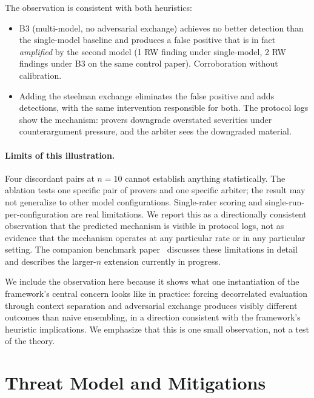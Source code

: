\documentclass[11pt]{article}
\begin{document}
The observation is consistent with both heuristics:
\begin{itemize}
\item B3 (multi-model, no adversarial exchange) achieves no better detection than the single-model baseline and produces a false positive that is in fact \emph{amplified} by the second model (1 RW finding under single-model, 2 RW findings under B3 on the same control paper). Corroboration without calibration.
\item Adding the steelman exchange eliminates the false positive and adds detections, with the same intervention responsible for both. The protocol logs show the mechanism: provers downgrade overstated severities under counterargument pressure, and the arbiter sees the downgraded material.
\end{itemize}

\paragraph{Limits of this illustration.} Four discordant pairs at $n = 10$ cannot establish anything statistically. The ablation tests one specific pair of provers and one specific arbiter; the result may not generalize to other model configurations. Single-rater scoring and single-run-per-configuration are real limitations. We report this as a directionally consistent observation that the predicted mechanism is visible in protocol logs, not as evidence that the mechanism operates at any particular rate or in any particular setting. The companion benchmark paper~\citep{brilliant2026benchmark} discusses these limitations in detail and describes the larger-$n$ extension currently in progress.

We include the observation here because it shows what one instantiation of the framework's central concern looks like in practice: forcing decorrelated evaluation through context separation and adversarial exchange produces visibly different outcomes than naive ensembling, in a direction consistent with the framework's heuristic implications. We emphasize that this is one small observation, not a test of the theory.

\section{Threat Model and Mitigations}
\end{document}
